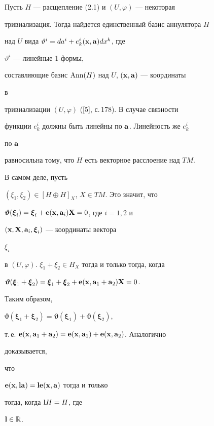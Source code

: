 \begin{pf} Пусть $H$ --- расщепление (2.1) и $(U,\varphi)$ --- некоторая  


тривиализация. Тогда найдется единственный базис аннулятора $H$ 


над $U$ вида $\vartheta^i=da^i+e^i_k(\bold x,\bold a)dx^k$, где 


$\vartheta^i$ --- линейные 1-формы,  


составляющие базис $\operatorname{Ann}(H)$ над $U$, $(\bold x,\bold a)$ --- координаты 


в 


тривиализации $(U,\varphi)$ ([5], с.\,178). В случае связности  


функции $e^i_k$ должны быть линейны по $\bold a$. Линейность же $e^i_k$ 


по $\bold a$  


равносильна тому, что $H$ есть векторное расслоение над $TM$. 


В самом деле, пусть 


$(\xi_1,\xi_2)\in[H\oplus H]_X$, $X\in TM$. Это значит, что 


$\boldsymbol\vartheta(\boldsymbol\xi_i)= 


\boldsymbol\xi_i+\bold e(\bold x,\bold a_i)\bold X=0$, где $i=1,2$ и 


$(\bold x,\bold X,\bold a_i,\boldsymbol\xi_i)$ --- координаты вектора 


$\xi_i$ 


в $(U,\varphi)$.\; $\xi_1+\xi_2\in H_X$ тогда и только тогда, когда 


$\boldsymbol\vartheta(\boldsymbol\xi_1+\boldsymbol\xi_2)= 


\boldsymbol\xi_1+\boldsymbol\xi_2+\bold e(\bold x,\bold a_1+ 


\bold a_2)\bold X=0$. 


Таким образом, 


$\boldsymbol\vartheta(\boldsymbol\xi_1+\boldsymbol\xi_2)= 


\boldsymbol\vartheta(\boldsymbol\xi_1)+\boldsymbol\vartheta 


(\boldsymbol\xi_2)$, 


т.\,е. $\bold e(\bold x,\bold a_1+\bold a_2)= 


\bold e(\bold x,\bold a_1)+\bold e(\bold x,\bold a_2)$. Аналогично 


доказывается,  


что 


$\bold e(\bold x,\bold l\bold a)=\bold l\bold e( 


\bold x,\bold a)$ тогда и только 


тогда, когда $\bold l H=H$, где 


$\bold l\in\Bbb R$. 


\end{pf} 


